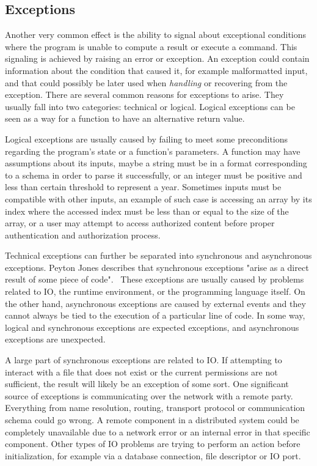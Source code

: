 \subsection{Exceptions} \label{effects:exceptions}
Another very common effect is the ability to signal about exceptional conditions where the program is unable to compute a result or execute a command. This signaling is achieved by raising an error or exception. An exception could contain information about the condition that caused it, for example malformatted input, and that could possibly be later used when \textit{handling} or recovering from the exception. There are several common reasons for exceptions to arise. They usually fall into two categories: technical or logical. Logical exceptions can be seen as a way for a function to have an alternative return value.~\cite{imprecise-exceptions}

Logical exceptions are usually caused by failing to meet some preconditions regarding the program's state or a function's parameters. A function may have assumptions about its inputs, maybe a string must be in a format corresponding to a schema in order to parse it successfully, or an integer must be positive and less than certain threshold to represent a year. Sometimes inputs must be compatible with other inputs, an example of such case is accessing an array by its index where the accessed index must be less than or equal to the size of the array, or a user may attempt to access authorized content before proper authentication and authorization process.

Technical exceptions can further be separated into synchronous and asynchronous exceptions. Peyton Jones describes that synchronous exceptions "arise as a direct result of some piece of code".~\cite{akward-squad} These exceptions are usually caused by problems related to IO, the runtime environment, or the programming language itself. On the other hand, asynchronous exceptions are caused by external events and they cannot always be tied to the execution of a particular line of code. In some way, logical and synchronous exceptions are expected exceptions, and asynchronous exceptions are unexpected.

A large part of synchronous exceptions are related to IO. If attempting to interact with a file that does not exist or the current permissions are not sufficient, the result will likely be an exception of some sort. One significant source of exceptions is communicating over the network with a remote party. Everything from name resolution, routing, transport protocol or communication schema could go wrong. A remote component in a distributed system could be completely unavailable due to a network error or an internal error in that specific component. Other types of IO problems are trying to perform an action before initialization, for example via a database connection, file descriptor or IO port.

